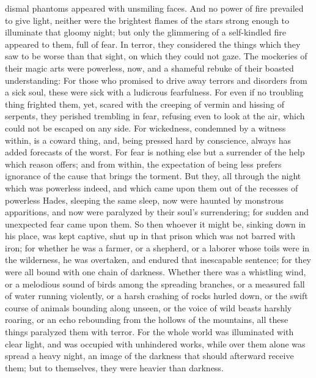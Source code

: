 dismal phantoms appeared with unsmiling faces.  And no
power of fire prevailed to give light, neither were the brightest flames
of the stars strong enough to illuminate that gloomy night;
 but only the glimmering of a self-kindled fire appeared
to them, full of fear. In terror, they considered the things which they
saw to be worse than that sight, on which they could not gaze.
 The mockeries of their magic arts were powerless, now,
and a shameful rebuke of their boasted understanding:  For
those who promised to drive away terrors and disorders from a sick soul,
these were sick with a ludicrous fearfulness.  For even if
no troubling thing frighted them, yet, scared with the creeping of
vermin and hissing of serpents,  they perished trembling
in fear, refusing even to look at the air, which could not be escaped on
any side.  For wickedness, condemned by a witness within,
is a coward thing, and, being pressed hard by conscience, always has
added forecasts of the worst.  For fear is nothing else
but a surrender of the help which reason offers;  and
from within, the expectation of being less prefers ignorance of the
cause that brings the torment.  But they, all through the
night which was powerless indeed, and which came upon them out of the
recesses of powerless Hades, sleeping the same sleep, 
now were haunted by monstrous apparitions, and now were paralyzed by
their soul's surrendering; for sudden and unexpected fear came upon
them.  So then whoever it might be, sinking down in his
place, was kept captive, shut up in that prison which was not barred
with iron;  for whether he was a farmer, or a shepherd,
or a laborer whose toils were in the wilderness, he was overtaken, and
endured that inescapable sentence; for they were all bound with one
chain of darkness.  Whether there was a whistling wind,
or a melodious sound of birds among the spreading branches, or a
measured fall of water running violently,  or a harsh
crashing of rocks hurled down, or the swift course of animals bounding
along unseen, or the voice of wild beasts harshly roaring, or an echo
rebounding from the hollows of the mountains, all these things paralyzed
them with terror.  For the whole world was illuminated
with clear light, and was occupied with unhindered works,
 while over them alone was spread a heavy night, an image
of the darkness that should afterward receive them; but to themselves,
they were heavier than darkness.

